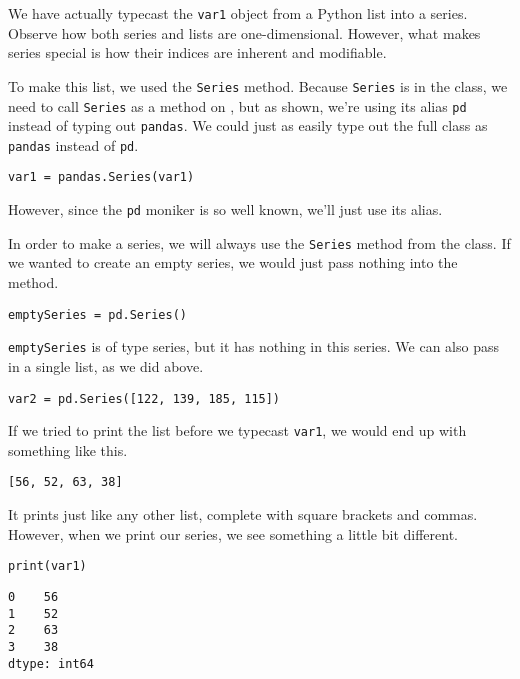 We have actually typecast the \verb|var1| object from a Python list into a  series. Observe how both series and lists are one-dimensional. However, what makes series special is how their indices are inherent and modifiable.\par
To make this list, we used the  \verb|Series| method. Because \verb|Series| is in the  class, we need to call \verb|Series| as a method on , but as shown, we're using its alias \verb|pd| instead of typing out \verb|pandas|. We could just as easily type out the full class as \verb|pandas| instead of \verb|pd|.
\begin{lstlisting}[style=pippython]
var1 = pandas.Series(var1)
\end{lstlisting}
However, since the \verb|pd| moniker is so well known, we'll just use its alias.\par
In order to make a series, we will always use the \verb|Series| method from the  class. If we wanted to create an empty series, we would just pass nothing into the method.
\begin{lstlisting}[style=pippython]
emptySeries = pd.Series()
\end{lstlisting}
\verb|emptySeries| is of type series, but it has nothing in this series. We can also pass in a single list, as we did above.
\begin{lstlisting}[style=pippython]
var2 = pd.Series([122, 139, 185, 115])
\end{lstlisting}\par
{}
If we tried to print the list before we typecast \verb|var1|, we would end up with something like this.
\begin{lstlisting}
[56, 52, 63, 38]
\end{lstlisting}
It prints just like any other list, complete with square brackets and commas. However, when we print our series, we see something a little bit different.
\begin{lstlisting}[style=pippython]
print(var1)
\end{lstlisting}
\begin{lstlisting}
0    56
1    52
2    63
3    38
dtype: int64
\end{lstlisting}
